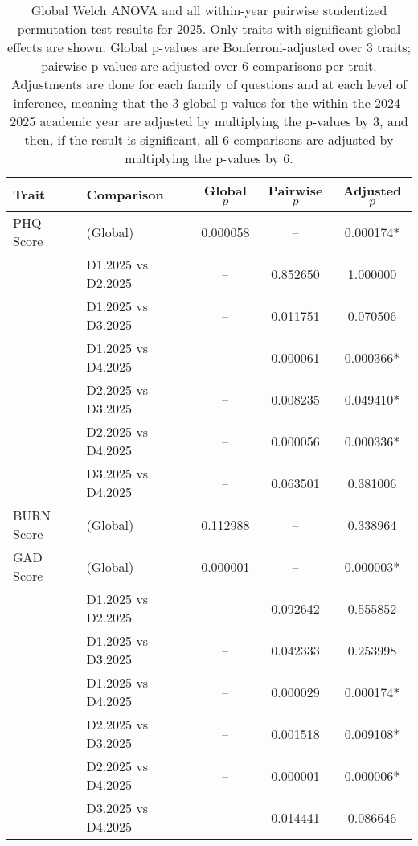 \documentclass{article}
\begin{document}
\begin{table}[H]
\centering
\begin{tabular}{llccc}
\hline
Trait & Comparison & Global $p$ & Pairwise $p$ & Adjusted $p$ \\
\hline
PHQ Score & (Global) & 0.000058 & -- & 0.000174* \\
          & D1.2025 vs D2.2025 & -- & 0.852650 & 1.000000 \\
          & D1.2025 vs D3.2025 & -- & 0.011751 & 0.070506 \\
          & D1.2025 vs D4.2025 & -- & 0.000061 & 0.000366* \\
          & D2.2025 vs D3.2025 & -- & 0.008235 & 0.049410* \\
          & D2.2025 vs D4.2025 & -- & 0.000056 & 0.000336* \\
          & D3.2025 vs D4.2025 & -- & 0.063501 & 0.381006 \\
BURN Score & (Global) & 0.112988 & -- & 0.338964 \\
GAD Score & (Global) & 0.000001 & -- & 0.000003* \\
          & D1.2025 vs D2.2025 & -- & 0.092642 & 0.555852 \\
          & D1.2025 vs D3.2025 & -- & 0.042333 & 0.253998 \\
          & D1.2025 vs D4.2025 & -- & 0.000029 & 0.000174* \\
          & D2.2025 vs D3.2025 & -- & 0.001518 & 0.009108* \\
          & D2.2025 vs D4.2025 & -- & 0.000001 & 0.000006* \\
          & D3.2025 vs D4.2025 & -- & 0.014441 & 0.086646 \\
\hline
\end{tabular}
\caption{Global Welch ANOVA and all within-year pairwise studentized permutation test results for 2025. Only traits with significant global effects are shown. Global p-values are Bonferroni-adjusted over 3 traits; pairwise p-values are adjusted over 6 comparisons per trait. Adjustments are done for each family of questions and at each level of inference, meaning that the 3 global p-values for the within the 2024-2025 academic year are adjusted by multiplying the p-values by 3, and then, if the result is significant, all 6 comparisons are adjusted by multiplying the p-values by 6. }
\label{tab:within_all_pairs}
\end{table}



  
\end{document}
